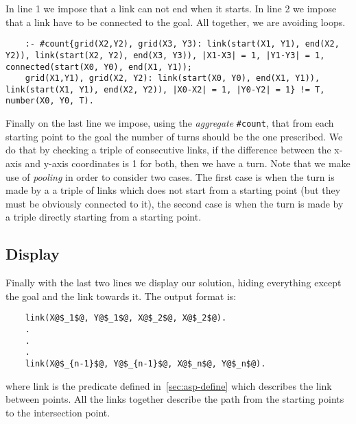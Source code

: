In line 1 we  impose that a link can not end when it starts. In line 2 we impose that a link have to be connected to the goal. All together, we are avoiding loops.

\begin{verbatim}
    :- #count{grid(X2,Y2), grid(X3, Y3): link(start(X1, Y1), end(X2, Y2)), link(start(X2, Y2), end(X3, Y3)), |X1-X3| = 1, |Y1-Y3| = 1, connected(start(X0, Y0), end(X1, Y1));
    grid(X1,Y1), grid(X2, Y2): link(start(X0, Y0), end(X1, Y1)), link(start(X1, Y1), end(X2, Y2)), |X0-X2| = 1, |Y0-Y2| = 1} != T, number(X0, Y0, T).
\end{verbatim}

Finally on the last line we impose, using the \emph{aggregate} \texttt{#count}, that from each starting point to the goal the number of turns should be the one prescribed. We do that by checking a triple of consecutive links, if the difference between the x-axis and y-axis coordinates is 1 for both, then we have a turn.
 Note that we make use of \emph{pooling} in order to consider two cases. The first case is when the turn is made by a a triple of links which does not start from a starting point (but they must be obviously connected to it), the second case is when the turn is made by a triple directly starting from a starting point.

\subsection{Display}

Finally with the last two lines we display our solution, hiding everything except the goal and the link towards it. The output format is:

\begin{verbatim}
    link(X@$_1$@, Y@$_1$@, X@$_2$@, X@$_2$@).
    .
    .
    .
    link(X@$_{n-1}$@, Y@$_{n-1}$@, X@$_n$@, Y@$_n$@).
\end{verbatim}

where link is the predicate defined in~\ref{sec:asp-define} which describes the link between points. All the links together describe the path from the starting points to the intersection point.
